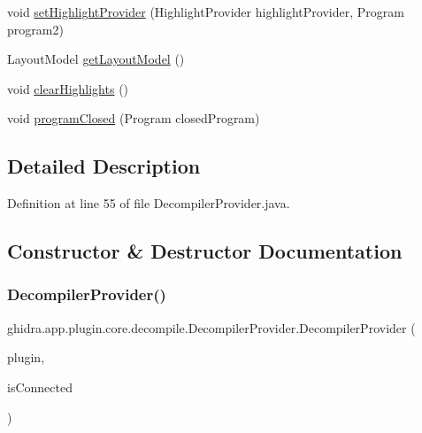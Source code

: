 \begin{DoxyCompactItemize}
void \mbox{\hyperlink{classghidra_1_1app_1_1plugin_1_1core_1_1decompile_1_1_decompiler_provider_aa85aabd65464da218ae9e203b1f9e198}{set\+Highlight\+Provider}} (Highlight\+Provider highlight\+Provider, Program program2)
\item 
Layout\+Model \mbox{\hyperlink{classghidra_1_1app_1_1plugin_1_1core_1_1decompile_1_1_decompiler_provider_a128dd05b94cfa8445f1fe80bc1410ee8}{get\+Layout\+Model}} ()
\item 
void \mbox{\hyperlink{classghidra_1_1app_1_1plugin_1_1core_1_1decompile_1_1_decompiler_provider_aca72811905babb72039a3a1ad1e81ad8}{clear\+Highlights}} ()
\item 
void \mbox{\hyperlink{classghidra_1_1app_1_1plugin_1_1core_1_1decompile_1_1_decompiler_provider_a4745be510ce90f499664f2955f9ec3e4}{program\+Closed}} (Program closed\+Program)
\end{DoxyCompactItemize}


\subsection{Detailed Description}


Definition at line 55 of file Decompiler\+Provider.\+java.



\subsection{Constructor \& Destructor Documentation}
\mbox{\label{classghidra_1_1app_1_1plugin_1_1core_1_1decompile_1_1_decompiler_provider_abceef9c1daf26284a5931d893fea0683}} 
\subsubsection{\texorpdfstring{DecompilerProvider()}{DecompilerProvider()}}
{\footnotesize\ttfamily ghidra.\+app.\+plugin.\+core.\+decompile.\+Decompiler\+Provider.\+Decompiler\+Provider (\begin{DoxyParamCaption}\item[{\mbox{\hyperlink{classghidra_1_1app_1_1plugin_1_1core_1_1decompile_1_1_decompile_plugin}{Decompile\+Plugin}}}]{plugin,  }\item[{boolean}]{is\+Connected }\end{DoxyParamCaption})\hspace{0.3cm}{\ttfamily [inline]}}




